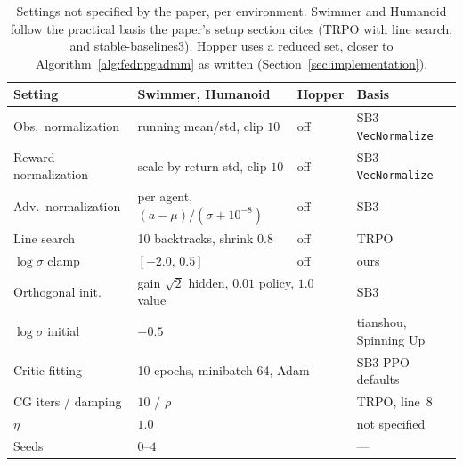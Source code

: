 \begin{table}[H]
  \centering
  \caption{Settings not specified by the paper, per environment. Swimmer and
  Humanoid follow the practical basis the paper's setup section cites (TRPO
  with line search, and stable-baselines3). Hopper uses a reduced set,
  closer to Algorithm~\ref{alg:fednpgadmm} as written
  (Section~\ref{sec:implementation}).}
  \label{tab:ours}
  \footnotesize
  \setlength{\tabcolsep}{4pt}
  \begin{tabular}{@{}llll@{}}
    \toprule
    Setting & Swimmer, Humanoid & Hopper & Basis \\
    \midrule
    Obs.\ normalization & running mean/std, clip $10$ & off & SB3 \texttt{VecNormalize} \\
    Reward normalization      & scale by return std, clip $10$ & off & SB3 \texttt{VecNormalize} \\
    Adv.\ normalization       & per agent, $(a-\mu)/(\sigma+10^{-8})$ & off & SB3 \\
    Line search               & 10 backtracks, shrink $0.8$ & off & TRPO \\
    $\log\sigma$ clamp        & $[-2.0,\, 0.5]$ & off & ours \\
    Orthogonal init.          & \multicolumn{2}{l}{gain $\sqrt{2}$ hidden, $0.01$ policy, $1.0$ value} & SB3 \\
    $\log\sigma$ initial      & \multicolumn{2}{l}{$-0.5$} & tianshou, Spinning Up \\
    Critic fitting            & \multicolumn{2}{l}{10 epochs, minibatch 64, Adam} & SB3 PPO defaults \\
    CG iters / damping        & \multicolumn{2}{l}{$10$ / $\rho$} & TRPO, line~8 \\
    $\eta$                    & \multicolumn{2}{l}{$1.0$} & not specified \\
    Seeds                     & \multicolumn{2}{l}{$0$--$4$} & --- \\
    \bottomrule
  \end{tabular}
\end{table}
